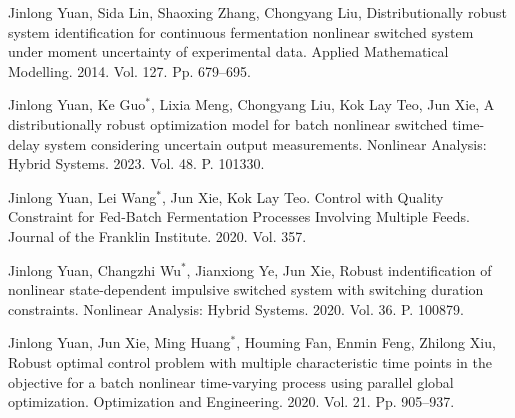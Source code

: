 \documentclass[12pt]{llncs}
\begin{document}
%
\begin{thebibliography}{5}
%
Jinlong Yuan, Sida Lin, Shaoxing Zhang, Chongyang Liu,
Distributionally robust system identification for continuous fermentation nonlinear switched system under moment uncertainty of experimental data.
Applied Mathematical Modelling. 2014. Vol. 127. Pp. 679--695.

Jinlong Yuan, Ke Guo$^{*}$, Lixia Meng, Chongyang Liu, Kok Lay Teo, Jun Xie,
A distributionally robust optimization model for batch nonlinear switched time-delay system considering uncertain output measurements.
Nonlinear Analysis: Hybrid Systems. 2023. Vol.  48. P. 101330.

Jinlong Yuan, Lei Wang$^{*}$, Jun Xie, Kok Lay Teo.
Control with Quality Constraint for Fed-Batch Fermentation Processes Involving Multiple Feeds.
Journal of the Franklin Institute. 2020. Vol. 357.

Jinlong Yuan, Changzhi Wu$^{*}$, Jianxiong Ye, Jun Xie,
Robust indentification of nonlinear state-dependent impulsive switched system with switching duration constraints.
Nonlinear Analysis: Hybrid Systems. 2020. Vol. 36. P. 100879.

Jinlong Yuan, Jun Xie, Ming Huang$^{*}$, Houming Fan, Enmin Feng, Zhilong Xiu,
Robust optimal control problem with multiple characteristic time points in the objective
for a batch nonlinear time-varying process using parallel global optimization.
Optimization and Engineering. 2020. Vol. 21. Pp. 905--937.

\end{thebibliography}
\end{document}
